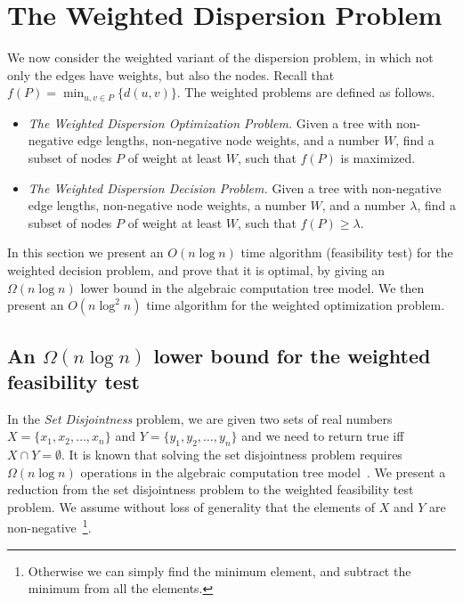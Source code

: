 \documentclass[11pt,a4paper]{article}
\theoremstyle{definition}
\theoremstyle{remark}
\begin{document}
\section{The Weighted Dispersion Problem}\label{section:weighted}
We now consider the weighted variant of the dispersion problem, in which not only the edges have weights, but also the nodes. Recall that $f(P)=\min_{u,v\in P} \{d(u,v)\}$. The weighted problems are defined as follows.
\begin{itemize} 
\item {\em The Weighted Dispersion Optimization Problem.} Given a tree with non-negative edge lengths, non-negative node weights, and a number $W$, find a subset of nodes $P$ of weight at least $W$, such that  $f(P)$ is maximized. 

\item {\em The Weighted Dispersion Decision Problem.} Given a tree with non-negative edge lengths, non-negative node weights, a number $W$, and a number $\lambda$, find a subset of nodes  $P$ of weight at least $W$, such that $f(P)\geq\lambda$. 
\end{itemize}


In this section we present an $O(n\log n)$ time algorithm (feasibility test) for the weighted decision problem, and prove that it is optimal, by giving an $\Omega(n\log n)$ lower bound in the algebraic computation tree model. We then present an $O(n\log^2 n)$ time algorithm for the weighted optimization problem. 

\subsection{An \boldmath$ \Omega (n\log n)$ lower bound for the weighted feasibility test}

In the {\em Set Disjointness} problem, we are given two sets of real numbers $X=\lbrace x_1,x_2,\ldots,x_n \rbrace$ and $Y=\lbrace y_1,y_2,\ldots,y_n \rbrace$ and we need to return true iff $X \cap Y = \emptyset$. 
It is known that solving the set disjointness problem requires $\Omega(n \log n)$ operations in the algebraic
computation tree model~\cite{BenOr}. %
We present a reduction from the set disjointness problem to the weighted feasibility test problem. We assume without loss of generality that the elements of $X$ and $Y$ are non-negative~\footnote{Otherwise
we can simply find the minimum element, and subtract the minimum from all the elements.}.
\end{document}

